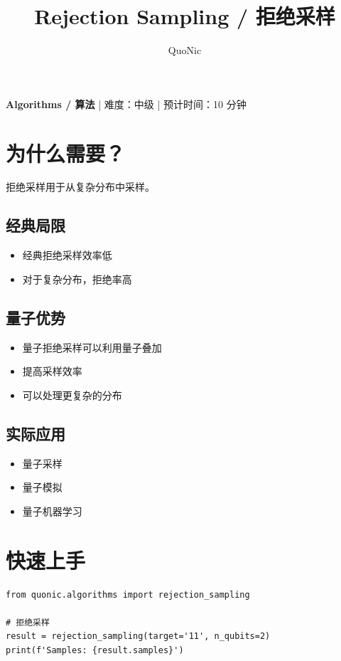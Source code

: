 \documentclass[12pt,a4paper]{article}
\title{Rejection Sampling / 拒绝采样}
\author{QuoNic}
\date{}
\begin{document}
\maketitle

\begin{center}
\textbf{Algorithms / 算法} | 难度：中级 | 预计时间：10 分钟
\end{center}

\tableofcontents
\newpage

\section{为什么需要？}

拒绝采样用于从复杂分布中采样。

\subsection{经典局限}
\begin{itemize}
  \item 经典拒绝采样效率低
  \item 对于复杂分布，拒绝率高
\end{itemize}

\subsection{量子优势}
\begin{itemize}
  \item 量子拒绝采样可以利用量子叠加
  \item 提高采样效率
  \item 可以处理更复杂的分布
\end{itemize}

\subsection{实际应用}
\begin{itemize}
  \item 量子采样
  \item 量子模拟
  \item 量子机器学习
\end{itemize}

\section{快速上手}

\begin{verbatim}
from quonic.algorithms import rejection_sampling

# 拒绝采样
result = rejection_sampling(target='11', n_qubits=2)
print(f'Samples: {result.samples}')
\end{verbatim}
\end{document}
